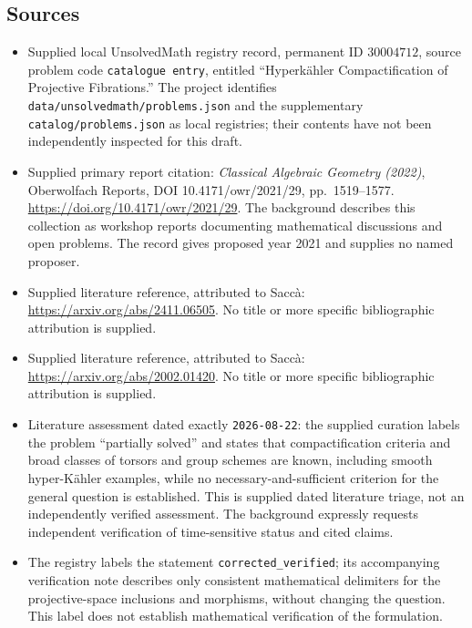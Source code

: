 \documentclass[11pt]{article}
\begin{document}
\subsection{Sources}
\begin{itemize}
\item Supplied local UnsolvedMath registry record, permanent ID \(30004712\), source problem code \texttt{catalogue entry}, entitled ``Hyperkähler Compactification of Projective Fibrations.'' The project identifies \texttt{data/unsolvedmath/problems.json} and the supplementary \texttt{catalog/problems.json} as local registries; their contents have not been independently inspected for this draft.
\item Supplied primary report citation: \emph{Classical Algebraic Geometry (2022)}, Oberwolfach Reports, DOI 10.4171/owr/2021/29, pp.\ 1519--1577. \url{https://doi.org/10.4171/owr/2021/29}. The background describes this collection as workshop reports documenting mathematical discussions and open problems. The record gives proposed year 2021 and supplies no named proposer.
\item Supplied literature reference, attributed to Saccà: \url{https://arxiv.org/abs/2411.06505}. No title or more specific bibliographic attribution is supplied.
\item Supplied literature reference, attributed to Saccà: \url{https://arxiv.org/abs/2002.01420}. No title or more specific bibliographic attribution is supplied.
\item Literature assessment dated exactly \texttt{2026-08-22}: the supplied curation labels the problem ``partially solved'' and states that compactification criteria and broad classes of torsors and group schemes are known, including smooth hyper-Kähler examples, while no necessary-and-sufficient criterion for the general question is established. This is supplied dated literature triage, not an independently verified assessment. The background expressly requests independent verification of time-sensitive status and cited claims.
\item The registry labels the statement \texttt{corrected\_verified}; its accompanying verification note describes only consistent mathematical delimiters for the projective-space inclusions and morphisms, without changing the question. This label does not establish mathematical verification of the formulation.
\end{itemize}
\end{document}
